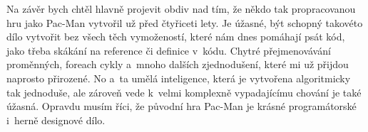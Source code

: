 \documentclass[a4]{article}
\begin{document}
Na závěr bych chtěl hlavně projevit obdiv nad tím, že někdo tak propracovanou hru jako Pac-Man vytvořil už před čtyřiceti lety. Je úžasné, být schopný takovéto dílo vytvořit bez všech těch vymožeností, které nám dnes pomáhají psát kód, jako třeba skákání na reference či definice v~kódu. Chytré přejmenovávání proměnných, foreach cykly a~mnoho dalších zjednodušení, které mi už přijdou naprosto přirozené. No a~ta umělá inteligence, která je vytvořena algoritmicky tak jednoduše, ale zároveň vede k~velmi komplexně vypadajícímu chování je také úžasná. Opravdu musím říci, že původní hra Pac-Man je krásné programátorské i~herně designové dílo.
\end{document}
